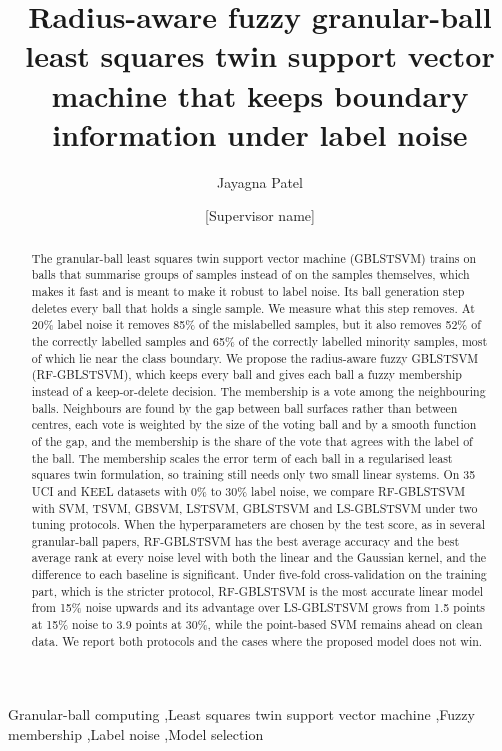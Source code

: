 \documentclass[preprint,12pt]{elsarticle}
\newcommand{\RF}{RF-GBLSTSVM}
\begin{document}
\begin{frontmatter}

\title{Radius-aware fuzzy granular-ball least squares twin support vector machine that keeps boundary information under label noise}

\author[inst1]{Jayagna Patel}
\author[inst1]{[Supervisor name]}
\address[inst1]{[Department], Birla Institute of Technology and Science, Pilani, India}

\begin{abstract}
The granular-ball least squares twin support vector machine (GBLSTSVM) trains on balls that summarise groups of samples instead of on the samples themselves, which makes it fast and is meant to make it robust to label noise. Its ball generation step deletes every ball that holds a single sample. We measure what this step removes. At 20\% label noise it removes 85\% of the mislabelled samples, but it also removes 52\% of the correctly labelled samples and 65\% of the correctly labelled minority samples, most of which lie near the class boundary. We propose the radius-aware fuzzy GBLSTSVM (\RF{}), which keeps every ball and gives each ball a fuzzy membership instead of a keep-or-delete decision. The membership is a vote among the neighbouring balls. Neighbours are found by the gap between ball surfaces rather than between centres, each vote is weighted by the size of the voting ball and by a smooth function of the gap, and the membership is the share of the vote that agrees with the label of the ball. The membership scales the error term of each ball in a regularised least squares twin formulation, so training still needs only two small linear systems. On 35 UCI and KEEL datasets with 0\% to 30\% label noise, we compare \RF{} with SVM, TSVM, GBSVM, LSTSVM, GBLSTSVM and LS-GBLSTSVM under two tuning protocols. When the hyperparameters are chosen by the test score, as in several granular-ball papers, \RF{} has the best average accuracy and the best average rank at every noise level with both the linear and the Gaussian kernel, and the difference to each baseline is significant. Under five-fold cross-validation on the training part, which is the stricter protocol, \RF{} is the most accurate linear model from 15\% noise upwards and its advantage over LS-GBLSTSVM grows from 1.5 points at 15\% noise to 3.9 points at 30\%, while the point-based SVM remains ahead on clean data. We report both protocols and the cases where the proposed model does not win.
\end{abstract}

\begin{keyword}
Granular-ball computing \sep Least squares twin support vector machine \sep Fuzzy membership \sep Label noise \sep Model selection
\end{keyword}

\end{frontmatter}
\end{document}
